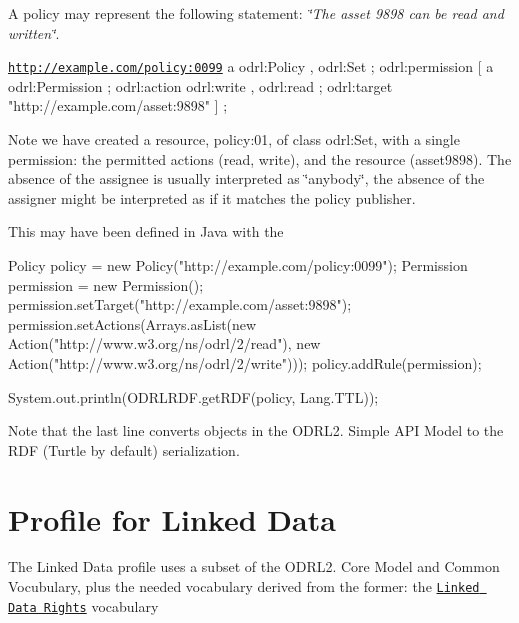 A policy may represent the following statement\-: {\itshape \char`\"{}\-The asset 9898 can be read and written\char`\"{}}. 
\begin{DoxyPre}
\href{http://example.com/policy:0099}{\tt http://example.com/policy:0099}
        a                 odrl:Policy , odrl:Set ;
        odrl:permission   [ a            odrl:Permission ;
                            odrl:action  odrl:write , odrl:read ;
                            odrl:target  "http://example.com/asset:9898"
                          ] ;
\end{DoxyPre}
 

Note we have created a resource, policy\-:01, of class odrl\-:Set, with a single permission\-: the permitted actions (read, write), and the resource (asset9898). The absence of the assignee is usually interpreted as \char`\"{}anybody\char`\"{}, the absence of the assigner might be interpreted as if it matches the policy publisher.

This may have been defined in Java with the 
\begin{DoxyPre}
        Policy policy = new Policy("http://example.com/policy:0099");
        Permission permission = new Permission();
        permission.setTarget("http://example.com/asset:9898");
        permission.setActions(Arrays.asList(new Action("http://www.w3.org/ns/odrl/2/read"), new Action("http://www.w3.org/ns/odrl/2/write")));
        policy.addRule(permission);\end{DoxyPre}



\begin{DoxyPre}        System.out.println(ODRLRDF.getRDF(policy, Lang.TTL));\end{DoxyPre}



\begin{DoxyPre}\end{DoxyPre}
 Note that the last line converts objects in the O\-D\-R\-L2. Simple A\-P\-I Model to the R\-D\-F (Turtle by default) serialization.

\begin{center}\end{center} 

\section*{Profile for Linked Data}

The Linked Data profile uses a subset of the O\-D\-R\-L2. Core Model and Common Vocubulary, plus the needed vocabulary derived from the former\-: the \href{http://oeg-dev.dia.fi.upm.es/licensius/static/ldr/}{\tt Linked Data Rights} vocabulary

